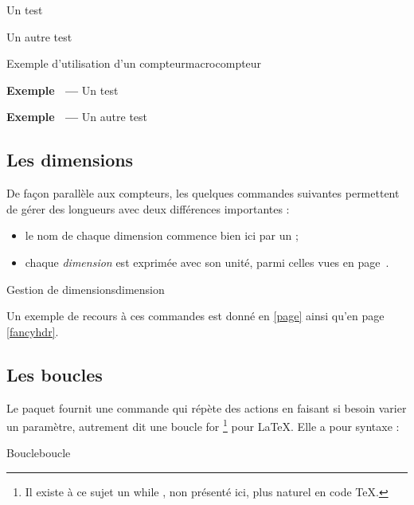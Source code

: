 \begin{codedoublevrai}
\exemple Un test \par
\exemple Un autre test  
\end{codedoublevrai}

\begin{codedoublefaux}{Exemple d'utilisation d'un compteur}{macrocompteur}
\setcounter{nbex}{0}
\newcommand{\exemple}{\addtocounter{nbex}{1}\textbf{Exemple \thenbex\ --- }}
\exemple Un test \par
\exemple Un autre test 
\end{codedoublefaux}


\subsection{Les dimensions}

De façon parallèle aux compteurs, les quelques commandes suivantes permettent de gérer des longueurs avec deux différences importantes :
\begin{itemize}
\item le nom de chaque dimension commence bien ici par un \macro{} ;
\item chaque \emph{dimension} est exprimée avec son unité, parmi celles vues en page~\pageref{unite}.
\end{itemize}

\begin{codesimple}{Gestion de dimensions}{dimension}
\setlength{\§textit£nom¤}{§textit£dimension¤}
\addtolength{\§textit£nom¤}{§textit£dimension¤}
\end{codesimple}

Un exemple de recours à ces  commandes est donné en \ref{page} ainsi qu'en page \ref{fancyhdr}.

\subsection{Les boucles}

Le paquet  fournit une commande qui répète des actions en faisant si besoin varier un paramètre, autrement dit une boucle \og for \fg\footnote{Il existe à ce sujet un \og while \fg, non présenté ici, plus naturel en code \TeX.} pour \LaTeX. Elle a pour syntaxe :

\begin{codesimple}{Boucle}{boucle}
\end{codesimple}

